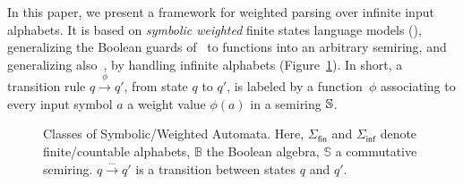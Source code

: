 In this paper, we present 
a framework for weighted parsing over infinite input alphabets.
It is based on \emph{symbolic weighted} finite states language models (\swM),
generalizing the Boolean guards of~\SA %
to functions into an arbitrary semiring,
and generalizing also~\WA, by handling infinite alphabets (Figure~\ref{fig:hierarchy}).
%
In short, a transition rule $q \xrightarrow{\phi} q'$, from state $q$ to $q'$,
is labeled by a function~$\phi$ associating to every input symbol $a$ a weight value $\phi(a)$
in a semiring $\mathbb{S}$.

\begin{figure}
\centering
{}
\caption{Classes of Symbolic/Weighted Automata.
Here, $\Sigma_\mathsf{fin}$ and $\Sigma_\mathsf{inf}$ denote finite/countable alphabets,
$\mathbb{B}$  the Boolean algebra,
$\mathbb{S}$ a commutative semiring.
$q \xrightarrow{\dots} q'$ is a transition between states $q$ and $q'$.}
\label{fig:hierarchy}
\end{figure}
